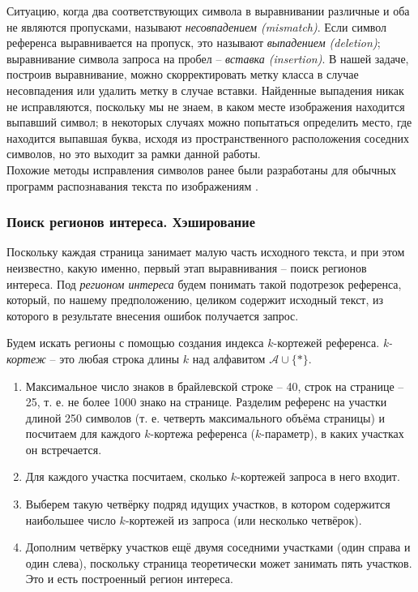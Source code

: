 \documentclass{main.tex}[subfiles]
\begin{document}
Ситуацию, когда два соответствующих символа в выравнивании различные и оба не являются пропусками, называют \emph{несовпадением (mismatch)}.
Если символ референса выравнивается на пропуск, это называют \emph{выпадением (deletion)}; выравнивание символа запроса на пробел -- \emph{вставка (insertion)}.
В нашей задаче, построив выравнивание, можно скорректировать метку класса в случае несовпадения или удалить метку в случае вставки.
Найденные выпадения никак не исправляются, поскольку мы не знаем, в каком месте изображения находится выпавший символ; в некоторых случаях можно попытаться определить место, где находится выпавшая буква, исходя из пространственного расположения соседних символов, но это выходит за рамки данной работы. \\

Похожие методы исправления символов ранее были разработаны для обычных программ распознавания текста по изображениям \cite{muller2021word_aln}.

\subsubsection{Поиск регионов интереса. Хэширование}


Поскольку каждая страница занимает малую часть исходного текста, и при этом неизвестно, какую именно, первый этап выравнивания -- поиск регионов интереса.
Под \emph{регионом интереса} будем понимать такой подотрезок референса, который, по нашему предположению, целиком содержит исходный текст, из которого в результате внесения ошибок получается запрос.

Будем искать регионы с помощью создания индекса $k$-кортежей референса.
\emph{k-кортеж} -- это любая строка длины $k$ над алфавитом $ \mathcal A  \cup \{ \ast \} $.

\begin{enumerate}[noitemsep]
    \item Максимальное число знаков в брайлевской строке -- 40, строк на странице -- 25, т. е. не более 1000 знако на странице.
    Разделим референс на участки длиной 250 символов (т. е. четверть максимального объёма страницы) и посчитаем для каждого $k$-кортежа референса ($k$-параметр), в каких участках он встречается.
    \item Для каждого участка посчитаем, сколько $k$-кортежей запроса в него входит.
    \item Выберем такую четвёрку подряд идущих участков, в котором содержится наибольшее число $k$-кортежей из запроса (или несколько четвёрок).
    \item Дополним четвёрку участков ещё двумя соседними участками (один справа и один слева), поскольку страница теоретически может занимать пять участков.
    Это и есть построенный регион интереса.
 \end{enumerate}
\end{document}
